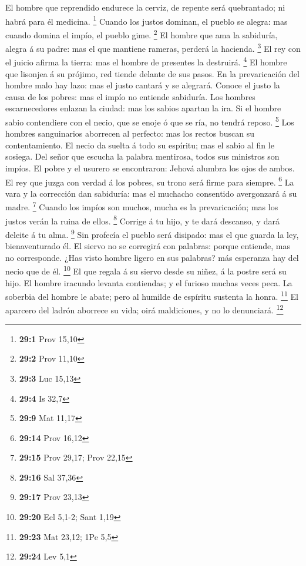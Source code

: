  El hombre que reprendido endurece la cerviz, de repente
será quebrantado; ni habrá para él medicina. \footnote{\textbf{29:1}
  Prov 15,10}  Cuando los justos dominan, el pueblo se
alegra: mas cuando domina el impío, el pueblo gime. \footnote{\textbf{29:2}
  Prov 11,10}  El hombre que ama la sabiduría, alegra á su
padre: mas el que mantiene rameras, perderá la hacienda. \footnote{\textbf{29:3}
  Luc 15,13}  El rey con el juicio afirma la tierra: mas el
hombre de presentes la destruirá. \footnote{\textbf{29:4} Is 32,7}
 El hombre que lisonjea á su prójimo, red tiende delante de
sus pasos.  En la prevaricación del hombre malo hay lazo:
mas el justo cantará y se alegrará.  Conoce el justo la
causa de los pobres: mas el impío no entiende sabiduría. 
Los hombres escarnecedores enlazan la ciudad: mas los sabios apartan la
ira.  Si el hombre sabio contendiere con el necio, que se
enoje ó que se ría, no tendrá reposo. \footnote{\textbf{29:9} Mat 11,17}
 Los hombres sanguinarios aborrecen al perfecto: mas los
rectos buscan su contentamiento.  El necio da suelta á todo
su espíritu; mas el sabio al fin le sosiega.  Del señor que
escucha la palabra mentirosa, todos sus ministros son impíos.
 El pobre y el usurero se encontraron: Jehová alumbra los
ojos de ambos.  El rey que juzga con verdad á los pobres,
su trono será firme para siempre. \footnote{\textbf{29:14} Prov 16,12}
 La vara y la corrección dan sabiduría: mas el muchacho
consentido avergonzará á su madre. \footnote{\textbf{29:15} Prov 29,17;
  Prov 22,15}  Cuando los impíos son muchos, mucha es la
prevaricación; mas los justos verán la ruina de ellos. \footnote{\textbf{29:16}
  Sal 37,36}  Corrige á tu hijo, y te dará descanso, y dará
deleite á tu alma. \footnote{\textbf{29:17} Prov 23,13} 
Sin profecía el pueblo será disipado: mas el que guarda la ley,
bienaventurado él.  El siervo no se corregirá con palabras:
porque entiende, mas no corresponde.  ¿Has visto hombre
ligero en sus palabras? más esperanza hay del necio que de él.
\footnote{\textbf{29:20} Ecl 5,1-2; Sant 1,19}  El que
regala á su siervo desde su niñez, á la postre será su hijo.
 El hombre iracundo levanta contiendas; y el furioso muchas
veces peca.  La soberbia del hombre le abate; pero al
humilde de espíritu sustenta la honra. \footnote{\textbf{29:23} Mat
  23,12; 1Pe 5,5}  El aparcero del ladrón aborrece su vida;
oirá maldiciones, y no lo denunciará. \footnote{\textbf{29:24} Lev 5,1}

